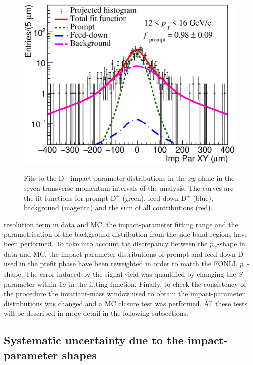\documentclass[b5paper,10pt,twoside,oldstyle,classica]{toptesi}
\newcommand{\pt}{p_\text{T}}
\begin{document}
\begin{figure}[h]
\begin{center}
\vspace{0cm}
{\includegraphics[scale = 0.25]{FitUnbinned_12-16_bkg_plot.eps}}
\caption{Fits to the D$^+$ impact-parameter distributions in the $xy$-plane in the seven transverse momentum intervals of the analysis. The curves are the fit functions for prompt D$^+$ (green), feed-down D$^+$ (blue), background (magenta) and the sum of all contributions (red).}
\label{finalfit}
\end{center}
\end{figure}  \clearpage \hspace{-0.61cm} resolution term in data and MC, the impact-parameter fitting range and the parametrisation of the background distribution from the side-band regions have been performed. To take into account the discrepancy between the $\pt$-shape in data and MC, the impact-parameter distributions of prompt and feed-down D$^+$ used in the prefit phase have been reweighted in order to match the FONLL $\pt$-shape. The error induced by the signal yield was quantified by changing the $S$ parameter within 1$\sigma$ in the fitting function. Finally, to check the consistency of the procedure the invariant-mass window used to obtain the impact-parameter distributions was changed and a MC closure test was performed. All these tests will be described in more detail in the following subsections.
\subsection{Systematic uncertainty due to the impact-parameter shapes}
\end{document}
